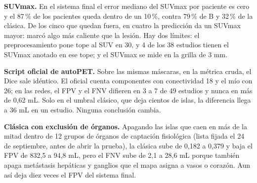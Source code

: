 \textbf{SUVmax.} En el sistema final el error mediano del SUVmax por paciente es cero y el 87\,\% de los pacientes queda dentro de un 10\,\%, contra 79\,\% de B y 32\,\% de la clásica. De los cinco que quedan fuera, en cuatro la predicción da un SUVmax mayor: marcó algo más caliente que la lesión. Hay dos límites: el preprocesamiento pone tope al SUV en 30, y 4 de los 38 estudios tienen el SUVmax anotado en ese tope; y el SUVmax se mide en la grilla de 3 mm.

\textbf{Script oficial de autoPET.} Sobre las mismas máscaras, en la métrica cruda, el Dice sale idéntico. El oficial cuenta componentes con conectividad 18 y el mío con 26; en las redes, el FPV y el FNV difieren en 3 a 7 de 49 estudios y nunca en más de 0,62 mL. Solo en el umbral clásico, que deja cientos de islas, la diferencia llega a 36 mL en un estudio. Ninguna conclusión cambia.

\textbf{Clásica con exclusión de órganos.} Apagando las islas que caen en más de la mitad dentro de 12 grupos de órganos de captación fisiológica (lista fijada el 24 de septiembre, antes de abrir la prueba), la clásica sube de \dmas{} 0,182 a 0,379 y baja el FPV de 832,5 a 94,8 mL, pero el FNV sube de 2,1 a 28,6 mL porque también apaga metástasis hepáticas y ganglios que el mapa asigna a vasos o corazón. Aun así deja diez veces el FPV del sistema final.

